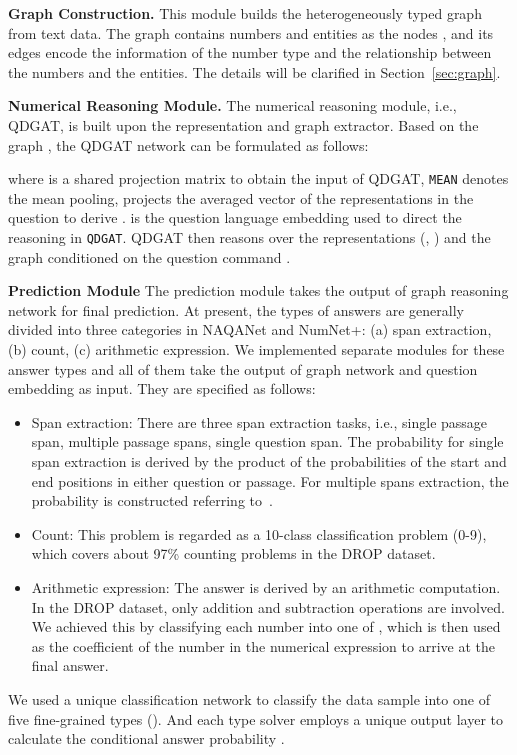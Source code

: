 \documentclass{article}
\begin{document}
{\bf Graph Construction.}
This module builds the heterogeneously typed graph from text data. The graph  contains numbers  and entities  as the nodes , and its edges  encode the information of the number type and the relationship between the numbers and the entities. 
The details will be clarified in Section~\ref{sec:graph}.




{\bf Numerical Reasoning Module.}
The numerical reasoning module, i.e., QDGAT, is built upon the representation and graph extractor.
Based on the graph , the QDGAT network can be formulated as follows:

where  is a shared projection matrix to obtain the input of QDGAT, \texttt{MEAN} denotes the mean pooling,  projects the averaged vector of the representations in the question to derive .
 is the question language embedding used to direct the reasoning in \texttt{QDGAT}.
QDGAT then reasons over the representations (, ) and the graph  conditioned on the question command .



{\bf Prediction Module}
The prediction module takes the output of graph reasoning network  for final prediction.
At present, the types of answers are generally divided into three categories in NAQANet and NumNet+: (a) span extraction, (b) count, (c) arithmetic expression.
We implemented separate modules for these answer types and all of them take the output of graph network  and question embedding  as input.
They are specified as follows:

\begin{itemize}\item Span extraction: There are three span extraction tasks, i.e., single passage span, multiple passage spans, single question span. The probability for single span extraction is derived by the product of the probabilities of the start and end positions in either question or passage. For multiple spans extraction, the probability is constructed referring to~\cite{DBLP:journals/corr/abs-1909-13375}.
\item Count: This problem is regarded as a 10-class classification problem (0-9), which covers about 97\% counting problems in the DROP dataset.
\item Arithmetic expression: The answer is derived by an arithmetic computation. In the DROP dataset, only addition and subtraction operations are involved. We achieved this by classifying each number into one of , which is then used as the coefficient of the number in the numerical expression to arrive at the final answer.
\end{itemize}
We used a unique classification network to classify the data sample into one of five fine-grained types ().
And each type solver employs a unique output layer to calculate the conditional answer probability .
\end{document}
